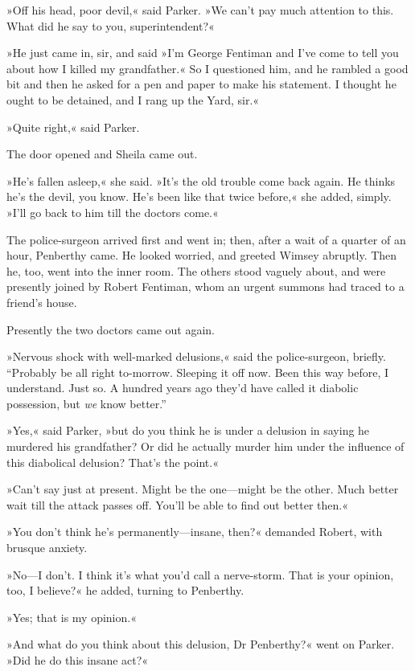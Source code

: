 »Off his head, poor devil,« said Parker. »We can't pay much attention to this. What did he say to you, superintendent?«

»He just came in, sir, and said »I'm George Fentiman and I've come to tell you about how I killed my grandfather.« So I questioned him, and he rambled a good bit and then he asked for a pen and paper to make his statement. I thought he ought to be detained, and I rang up the Yard, sir.«

»Quite right,« said Parker.

The door opened and Sheila came out.

»He's fallen asleep,« she said. »It's the old trouble come back again. He thinks he's the devil, you know. He's been like that twice before,« she added, simply. »I'll go back to him till the doctors come.«

The police-surgeon arrived first and went in; then, after a wait of a quarter of an hour, Penberthy came. He looked worried, and greeted Wimsey abruptly. Then he, too, went into the inner room. The others stood vaguely about, and were presently joined by Robert Fentiman, whom an urgent summons had traced to a friend's house.

Presently the two doctors came out again.

»Nervous shock with well-marked delusions,« said the police-surgeon, briefly. \enquote{Probably be all right to-morrow. Sleeping it off now. Been this way before, I understand. Just so. A hundred years ago they'd have called it diabolic possession, but \textit{we} know better.}

»Yes,« said Parker, »but do you think he is under a delusion in saying he murdered his grandfather? Or did he actually murder him under the influence of this diabolical delusion? That's the point.«

»Can't say just at present. Might be the one\allowbreak---\allowbreak might be the other. Much better wait till the attack passes off. You'll be able to find out better then.«

»You don't think he's permanently\allowbreak---\allowbreak insane, then?« demanded Robert, with brusque anxiety.

»No\allowbreak---\allowbreak I don't. I think it's what you'd call a nerve-storm. That is your opinion, too, I believe?« he added, turning to Penberthy.

»Yes; that is my opinion.«

»And what do you think about this delusion, Dr Penberthy?« went on Parker. »Did he do this insane act?«


